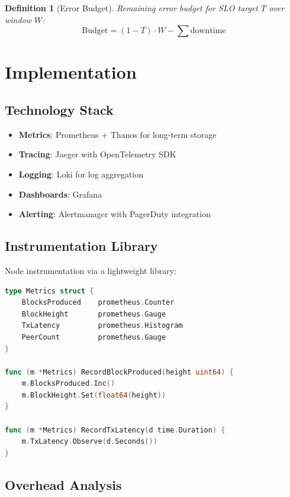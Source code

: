 \documentclass[11pt,a4paper]{article}
\newtheorem{definition}{Definition}
\begin{document}
\begin{definition}[Error Budget]
Remaining error budget for SLO target $T$ over window $W$:
\[
\text{Budget} = (1 - T) \cdot W - \sum \text{downtime}
\]
\end{definition}

\section{Implementation}

\subsection{Technology Stack}

\begin{itemize}
    \item \textbf{Metrics}: Prometheus + Thanos for long-term storage
    \item \textbf{Tracing}: Jaeger with OpenTelemetry SDK
    \item \textbf{Logging}: Loki for log aggregation
    \item \textbf{Dashboards}: Grafana
    \item \textbf{Alerting}: Alertmanager with PagerDuty integration
\end{itemize}

\subsection{Instrumentation Library}

Node instrumentation via a lightweight library:

\begin{lstlisting}[language=Go]
type Metrics struct {
    BlocksProduced    prometheus.Counter
    BlockHeight       prometheus.Gauge
    TxLatency         prometheus.Histogram
    PeerCount         prometheus.Gauge
}

func (m *Metrics) RecordBlockProduced(height uint64) {
    m.BlocksProduced.Inc()
    m.BlockHeight.Set(float64(height))
}

func (m *Metrics) RecordTxLatency(d time.Duration) {
    m.TxLatency.Observe(d.Seconds())
}
\end{lstlisting}

\subsection{Overhead Analysis}
\end{document}

